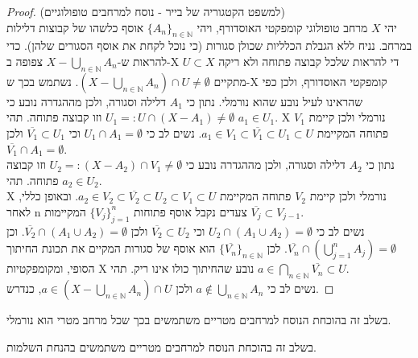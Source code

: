 \documentclass{tstextbook}
\begin{document}
\begin{proof}
(למשפט הקטגוריה של בייר - נוסח למרחבים טופולוגיים)\\

יהי \(X\) מרחב טופולוגי קומפקטי האוסדורף, ויהי \(\{A_{n}\}_{n\in\mathbb{N}}\) אוסף כלשהו של קבוצות דלילות במרחב. נניח ללא הגבלת הכלליות שכולן סגורות (כי נוכל לקחת את אוסף הסגורים שלהן).
כדי להראות ש-\(X-\bigcup_{n\in\mathbb{N}}A_{n}\) צפופה ב-X די להראות שלכל קבוצה פתוחה ולא ריקה \(U\subset X\) מתקיים \((X-\bigcup_{n\in\mathbb{N}}A_{n})\cap U\ne\emptyset\).
נשתמש בכך ש-X קומפקטי האוסדורף, ולכן כפי שהראינו לעיל נובע שהוא נורמלי.
נתון כי \(A_{1}\) דלילה וסגורה, ולכן מההגדרה נובע כי \(U_{1}=:U\cap(X-A_{1})\ne\emptyset\) וזו קבוצה פתוחה. תהי \(a_{1}\in U_{1}\).
X נורמלי ולכן קיימת \(V_{1}\) פתוחה המקיימת \(a_{1}\in V_{1}\subset\overline{V_{1}}\subset U_{1}\subset U\).
נשים לב כי \(U_{1}\cap A_{1}=\emptyset\) וכי \(\overline{V_{1}}\subset U_{1}\) ולכן \(\overline{V_{1}}\cap A_{1}=\emptyset\).\\

נתון כי \(A_{2}\) דלילה וסגורה, ולכן מההגדרה נובע כי \(U_{2}=:(X-A_{2})\cap V_{1}\ne\emptyset\) וזו קבוצה פתוחה.
תהי \(a_{2}\in U_{2}\).\\

X נורמלי ולכן קיימת \(V_{2}\) פתוחה המקיימת \(a_{2}\in V_{2}\subset \overline{V_{2}}\subset U_{2}\subset V_{1}\subset U\).
ובאופן כללי, לאחר n צעדים נקבל אוסף פתוחות \(\{V_{j}\}_{j=1}^{n}\) המקיימות \(\overline{V_{j}}\subset V_{j-1}\).\\

נשים לב כי \(U_{2}\cap(A_{1}\cup A_{2})=\emptyset\) וכי \(\overline{V_{2}}\subset U_{2}\) ולכן \(\overline{V_{2}}\cap(A_{1}\cup A_{2})=\emptyset\).
וכן \(\overline{V_{n}}\cap(\bigcup_{j=1}^{n}A_{j})=\emptyset\).
לכן \(\{\overline{V_{n}}\}_{n\in\mathbb{N}}\) הוא אוסף של סגורות המקיים את תכונת החיתוך הסופי, ומקומפקטיות X נובע שהחיתוך כולו אינו ריק.
תהי \(a\in\bigcap_{n\in\mathbb{N}}\overline{V_{n}}\subset U\).\\

נשים לב כי \(a\notin\bigcup_{n\in\mathbb{N}}A_{n}\) ולכן \(a\in(X-\bigcup_{n\in\mathbb{N}}A_{n})\cap U\), כנדרש.

\end{proof}
\begin{remark}
בשלב זה בהוכחת הנוסח למרחבים מטריים משתמשים בכך שכל מרחב מטרי הוא נורמלי.  

\end{remark}
\begin{remark}
בשלב זה בהוכחת הנוסח למרחבים מטריים משתמשים בהנחת השלמות.  

\end{remark}
\end{document}
